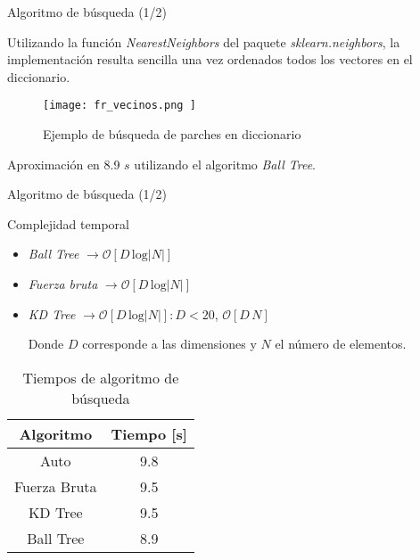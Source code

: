\begin{frame}{Algoritmo de búsqueda (1/2)}

    Utilizando la función \emph{NearestNeighbors} del paquete \emph{sklearn.neighbors},
    la implementación resulta sencilla una vez ordenados todos los vectores en el 
    diccionario. 

    \begin{figure}[H]
        \texttt{[image:  fr\_vecinos.png ]}
        \centering
        \caption{ Ejemplo de búsqueda de parches en diccionario}
        \label{fig:fr_vecinos}
    \end{figure}

    Aproximación en 8.9 $s$ utilizando el algoritmo \emph{Ball Tree}. 

\end{frame}

\begin{frame}{Algoritmo de búsqueda (1/2)}

    \begin{block}{Complejidad temporal}
        \begin{itemize}
            \item \emph{Ball Tree} $\to \mathcal{O}[D\,\text{log}|N| ]$
            \item \emph{Fuerza bruta} $\to \mathcal{O}[D\,\text{log}|N| ]$
            \item \emph{KD Tree} $\to \mathcal{O}[D\,\text{log}|N| ] : D < 20$, $\mathcal{O}[D\,N]$
            
            Donde $D$ corresponde a las dimensiones y $N$ el número de elementos.  
        \end{itemize}
    \end{block}

    \begin{table}[H]
        \caption{Tiempos de algoritmo de búsqueda}
        \label{tb:tiempos_snn}
        \centering
        \begin{tabular}{|c|c|}
        \hline
        \textbf{Algoritmo}    & \textbf{Tiempo} {[}s{]} \\ \hline
        Auto         & 9.8            \\ \hline
        Fuerza Bruta & 9.5            \\ \hline
        KD Tree      & 9.5            \\ \hline
        Ball Tree    & 8.9            \\ \hline
        \end{tabular}
    \end{table}

\end{frame}

